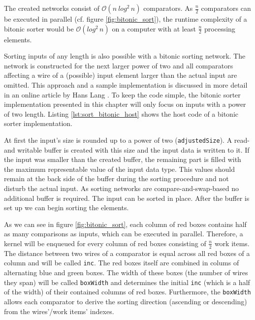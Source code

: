 The created networks consist of $\mathcal{O}(n\:log^2\,n)$ comparators. As $\frac{n}{2}$ comparators can be executed in parallel (cf. figure \ref{fig:bitonic_sort}), the runtime complexity of a bitonic sorter would be $\mathcal{O}(log^2\, n)$ on a computer with at least $\frac{n}{2}$ processing elements.

Sorting inputs of any length is also possible with a bitonic sorting network. The network is constructed for the next larger power of two and all comparators affecting a wire of a (possible) input element larger than the actual input are omitted. This approach and a sample implementation is discussed in more detail in an online article by Hans Lang \cite{sort_bitonic_arbitrary_n}. To keep the code simple, the bitonic sorter implementation presented in this chapter will only focus on inputs with a power of two length.
Listing \ref{lst:sort_bitonic_host} shows the host code of a bitonic sorter implementation.



At first the input's size is rounded up to a power of two (\lstinline!adjustedSize!). A read- and writable buffer is created with this size and the input data is written to it. If the input was smaller than the created buffer, the remaining part is filled with the maximum representable value of the input data type. This values should remain at the back side of the buffer during the sorting procedure and not disturb the actual input. As sorting networks are compare-and-swap-based no additional buffer is required. The input can be sorted in place.
After the buffer is set up we can begin sorting the elements.

As we can see in figure \ref{fig:bitonic_sort}, each column of red boxes contains half as many comparisons as inputs, which can be executed in parallel. Therefore, a kernel will be enqueued for every column of red boxes consisting of $\frac{n}{2}$ work items. The distance between two wires of a comparator is equal across all red boxes of a column and will be called \lstinline!inc!. The red boxes itself are combined in colums of alternating blue and green boxes. The width of these boxes (the number of wires they span) will be called \lstinline!boxWidth! and determines the initial \lstinline!inc! (which is a half of the width) of their contained columns of red boxes. Furthermore, the \lstinline!boxWidth! allows each comparator to derive the sorting direction (ascending or descending) from the wires'/work items' indexes.

